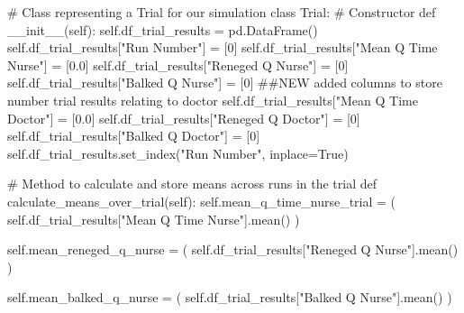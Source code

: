 \documentclass[
  letterpaper,
  DIV=11,
  numbers=noendperiod]{scrreprt}
\newenvironment{Shaded}{}{}
\newcommand{\CommentTok}[1]{\textcolor[rgb]{0.42,0.45,0.49}{#1}}
\newcommand{\DecValTok}[1]{\textcolor[rgb]{0.00,0.36,0.77}{#1}}
\newcommand{\FloatTok}[1]{\textcolor[rgb]{0.00,0.36,0.77}{#1}}
\newcommand{\FunctionTok}[1]{\textcolor[rgb]{0.44,0.26,0.76}{#1}}
\newcommand{\KeywordTok}[1]{\textcolor[rgb]{0.84,0.23,0.29}{#1}}
\newcommand{\NormalTok}[1]{\textcolor[rgb]{0.14,0.16,0.18}{#1}}
\newcommand{\OperatorTok}[1]{\textcolor[rgb]{0.14,0.16,0.18}{#1}}
\newcommand{\StringTok}[1]{\textcolor[rgb]{0.01,0.18,0.38}{#1}}
\newcommand{\VariableTok}[1]{\textcolor[rgb]{0.89,0.38,0.04}{#1}}
\begin{document}
\begin{tcolorbox}
\begin{Shaded}
\begin{Highlighting}[]
\CommentTok{\# Class representing a Trial for our simulation}
\KeywordTok{class}\NormalTok{ Trial:}
    \CommentTok{\# Constructor}
    \KeywordTok{def}  \FunctionTok{\_\_init\_\_}\NormalTok{(}\VariableTok{self}\NormalTok{):}
        \VariableTok{self}\NormalTok{.df\_trial\_results }\OperatorTok{=}\NormalTok{ pd.DataFrame()}
        \VariableTok{self}\NormalTok{.df\_trial\_results[}\StringTok{"Run Number"}\NormalTok{] }\OperatorTok{=}\NormalTok{ [}\DecValTok{0}\NormalTok{]}
        \VariableTok{self}\NormalTok{.df\_trial\_results[}\StringTok{"Mean Q Time Nurse"}\NormalTok{] }\OperatorTok{=}\NormalTok{ [}\FloatTok{0.0}\NormalTok{]}
        \VariableTok{self}\NormalTok{.df\_trial\_results[}\StringTok{"Reneged Q Nurse"}\NormalTok{] }\OperatorTok{=}\NormalTok{ [}\DecValTok{0}\NormalTok{]}
        \VariableTok{self}\NormalTok{.df\_trial\_results[}\StringTok{"Balked Q Nurse"}\NormalTok{] }\OperatorTok{=}\NormalTok{ [}\DecValTok{0}\NormalTok{]}
        \CommentTok{\#\#NEW added columns to store number trial results relating to doctor}
        \VariableTok{self}\NormalTok{.df\_trial\_results[}\StringTok{"Mean Q Time Doctor"}\NormalTok{] }\OperatorTok{=}\NormalTok{ [}\FloatTok{0.0}\NormalTok{]}
        \VariableTok{self}\NormalTok{.df\_trial\_results[}\StringTok{"Reneged Q Doctor"}\NormalTok{] }\OperatorTok{=}\NormalTok{ [}\DecValTok{0}\NormalTok{]}
        \VariableTok{self}\NormalTok{.df\_trial\_results[}\StringTok{"Balked Q Doctor"}\NormalTok{] }\OperatorTok{=}\NormalTok{ [}\DecValTok{0}\NormalTok{]}
        \VariableTok{self}\NormalTok{.df\_trial\_results.set\_index(}\StringTok{"Run Number"}\NormalTok{, inplace}\OperatorTok{=}\VariableTok{True}\NormalTok{)}

    \CommentTok{\# Method to calculate and store means across runs in the trial}
    \KeywordTok{def}\NormalTok{ calculate\_means\_over\_trial(}\VariableTok{self}\NormalTok{):}
        \VariableTok{self}\NormalTok{.mean\_q\_time\_nurse\_trial }\OperatorTok{=}\NormalTok{ (}
            \VariableTok{self}\NormalTok{.df\_trial\_results[}\StringTok{"Mean Q Time Nurse"}\NormalTok{].mean()}
\NormalTok{        )}

        \VariableTok{self}\NormalTok{.mean\_reneged\_q\_nurse }\OperatorTok{=}\NormalTok{ (}
            \VariableTok{self}\NormalTok{.df\_trial\_results[}\StringTok{"Reneged Q Nurse"}\NormalTok{].mean()}
\NormalTok{        )}

        \VariableTok{self}\NormalTok{.mean\_balked\_q\_nurse }\OperatorTok{=}\NormalTok{ (}
            \VariableTok{self}\NormalTok{.df\_trial\_results[}\StringTok{"Balked Q Nurse"}\NormalTok{].mean()}
\NormalTok{        )}


\end{Highlighting}
\end{Shaded}
\end{tcolorbox}
\end{document}
